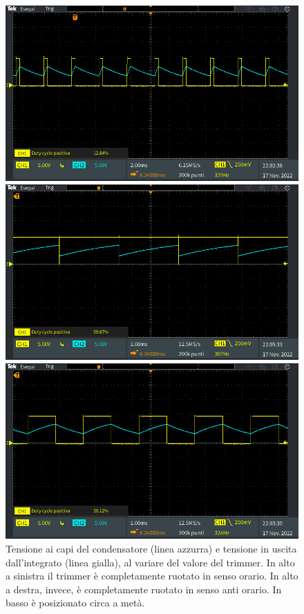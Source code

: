 \begin{figure}[tbh]
	\centering
	\begin{minipage}{.496\textwidth}
		\includegraphics[width=\linewidth]{./ImageFiles/Laboratorio 5/TEK00032.PNG}
	\end{minipage}
	\begin{minipage}{.496\textwidth}
		\includegraphics[width=\linewidth]{./ImageFiles/Laboratorio 5/TEK00034.PNG}
	\end{minipage}
	\includegraphics[width=.496\textwidth]{./ImageFiles/Laboratorio 5/TEK00033.PNG}
	\caption{Tensione ai capi del condensatore (linea azzurra) e tensione in uscita dall'integrato (linea gialla), al variare del valore del trimmer. In alto a sinistra il trimmer è completamente ruotato in senso orario. In alto a destra, invece, è completamente ruotato in senso anti orario. In basso è posizionato circa a metà.}
	\label{fig:circuito_4_plot}
\end{figure}

